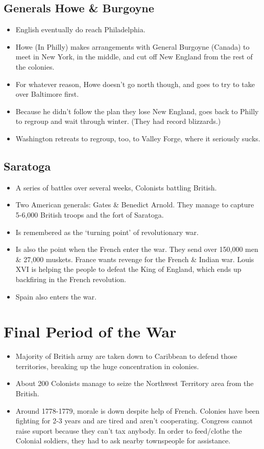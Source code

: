 \documentclass{article}
\begin{document}
    \subsection{Generals Howe \& Burgoyne}
      \begin{itemize}
        \item English eventually do reach Philadelphia.
        \item Howe (In Philly) makes arrangements with General Burgoyne (Canada) to meet in New York, in the middle, and cut off New England from the rest of the colonies.
        \item For whatever reason, Howe doesn't go north though, and goes to try to take over Baltimore first.
        \item Because he didn't follow the plan they lose New England, goes back to Philly to regroup and wait through winter. (They had record blizzards.)
        \item Washington retreats to regroup, too, to Valley Forge, where it seriously sucks.
      \end{itemize}

    \subsection{Saratoga}
      \begin{itemize}
        \item A series of battles over several weeks, Colonists battling British.
        \item Two American generals: Gates \& Benedict Arnold. They manage to capture 5-6,000 British troops and the fort of Saratoga.
        \item Is remembered as the `turning point' of revolutionary war.
        \item Is also the point when the French enter the war. They send over 150,000 men \& 27,000 muskets. France wants revenge for the French \& Indian war. Louis XVI is helping the people to defeat the King of England, which ends up backfiring in the French revolution.
        \item Spain also enters the war.
      \end{itemize}

  \section{Final Period of the War}
    \begin{itemize}
      \item Majority of British army are taken down to Caribbean to defend those territories, breaking up the huge concentration in colonies. 
      \item About 200 Colonists manage to seize the Northwest Territory area from the British. 
      \item Around 1778-1779, morale is down despite help of French. Colonies have been fighting for 2-3 years and are tired and aren't cooperating. Congress cannot raise suport because they can't tax anybody. In order to feed/clothe the Colonial soldiers, they had to ask nearby townspeople for assistance.
    \end{itemize}
\end{document}
